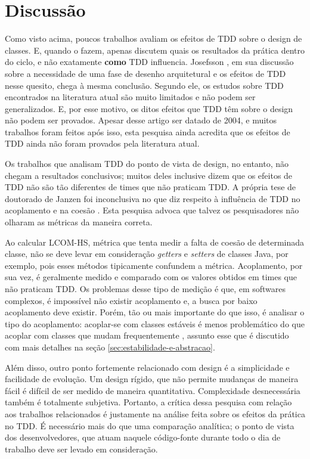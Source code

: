 \section{Discussão}

Como visto acima, poucos trabalhos avaliam os efeitos de TDD sobre o design de
classes. E, quando o fazem, apenas discutem quais os resultados da prática
dentro do ciclo, e não exatamente \textbf{como} TDD influencia. Josefsson
\cite{josefsson}, em sua discussão sobre a necessidade de uma fase de desenho
arquitetural e os efeitos de TDD nesse quesito, chega à mesma conclusão. Segundo
ele, os estudos sobre TDD encontrados na literatura atual são muito limitados e
não podem ser generalizados. E, por esse motivo, os ditos efeitos que TDD têm 
sobre o design não podem ser provados. Apesar desse artigo ser datado de 2004, e
muitos trabalhos foram feitos após isso, esta pesquisa ainda acredita que os
efeitos de TDD ainda não foram provados pela literatura atual.

Os trabalhos que analisam TDD do ponto de vista de design, no entanto, não
chegam a resultados conclusivos; muitos deles inclusive dizem que os efeitos
de TDD não são tão diferentes de times que não praticam TDD.  A própria tese de
doutorado de Janzen foi inconclusiva no que diz respeito à influência de TDD no 
acoplamento e na coesão \cite{janzen-phd}. Esta pesquisa advoca que talvez os 
pesquisadores não olharam as métricas da maneira correta.

Ao calcular LCOM-HS, métrica que tenta medir a falta de coesão de determinada
classe, não se deve levar em consideração \textit{getters} e \textit{setters} de
classes Java, por exemplo, pois esses métodos tipicamente confundem a métrica.
Acoplamento, por sua vez, é geralmente medido e comparado com os valores
obtidos em times que não praticam TDD. Os problemas desse tipo de medição é que,
em softwares complexos, é impossível não existir acoplamento e, a busca por
baixo acoplamento deve existir. Porém, tão ou mais importante do que isso, é
analisar o tipo do acoplamento: acoplar-se com classes estáveis é menos
problemático do que acoplar com classes que mudam frequentemente
\cite{bob-martin}, assunto esse que é discutido com mais detalhes na seção
\ref{sec:estabilidade-e-abstracao}. 

Além disso, outro ponto fortemente relacionado com design é a simplicidade e
facilidade de evolução. Um design rígido, que não permite mudanças de maneira
fácil é difícil de ser medido de maneira quantitativa. Complexidade
desnecessária também é totalmente subjetiva. Portanto, a crítica dessa pesquisa
com relação aos trabalhos relacionados é justamente na análise feita sobre os
efeitos da prática no TDD. É necessário mais do que uma comparação analítica; o
ponto de vista dos desenvolvedores, que atuam naquele código-fonte durante todo
o dia de trabalho deve ser levado em consideração.

